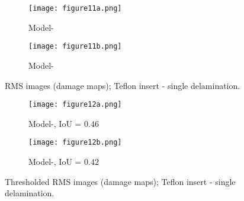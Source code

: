 \begin{sloppypar}
	\begin{figure} [!ht]
		\begin{subfigure}[b]{.48\textwidth}
			\centering
			\texttt{[image: figure11a.png]}
			\caption{Model-}
			\label{fig:RMS_CFRP_Teflon_3o_saeed}
		\end{subfigure}
		\hfill
		\begin{subfigure}[b]{.48\textwidth}
			\centering
			\texttt{[image: figure11b.png]}
			\caption{Model-} 
			\label{fig:RMS_CFRP_Teflon_3o_ijjeh}
		\end{subfigure}
		\caption{RMS images (damage maps); Teflon insert - single delamination.}
		\label{fig:RMS_CFRP_Teflon_3o_images}
	\end{figure} 
	\begin{figure} [!ht]
		\begin{subfigure}[b]{.48\textwidth}
			\centering
			\texttt{[image: figure12a.png]}
			\caption{Model-, IoU = \(0.46\)}
			\label{fig:RMS_threshold_CFRP_Teflon_3o_saeed}
		\end{subfigure}
		\hfill
		\begin{subfigure}[b]{.48\textwidth}
			\centering
			\texttt{[image: figure12b.png]}
			\caption{Model-, IoU = \(0.42\)} 
			\label{fig:RMS_threshold_CFRP_Teflon_3o_ijjeh}
		\end{subfigure}
		\caption{Thresholded RMS images (damage maps); Teflon insert - single delamination.}
		\label{fig:RMS_threshold_CFRP_Teflon_3o_images}
	\end{figure} 
	\clearpage


\end{sloppypar}
